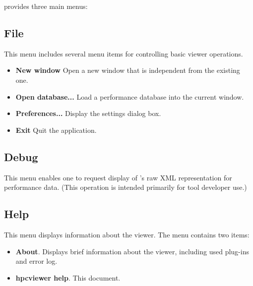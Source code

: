 \hpcviewer{} provides three main menus:


\subsection{File}
This menu includes several menu items for controlling basic viewer operations.
\begin{itemize}
\item \textbf{New window}
  Open a new \hpcviewer{} window that is independent from the existing one.

\item \textbf{Open database...}
  Load a performance database into the current \hpcviewer{} window.

\item \textbf{Preferences...}
  Display the settings dialog box.

\item \textbf{Exit}
  Quit the \hpcviewer{} application.

\end{itemize}


\subsection{Debug}

This menu enables one to request display of \HPCToolkit{}'s raw XML representation for performance data.
(This operation is intended primarily for tool developer use.)


\subsection{Help}

This menu displays information about the viewer. The menu contains two items:
\begin{itemize}

\item \textbf{About}.
  Displays brief information about the viewer, including used plug-ins and error log.

\item \textbf{hpcviewer help}.
  This document.

\end{itemize}


